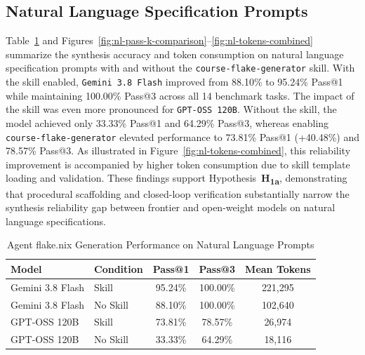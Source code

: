 \subsection{Natural Language Specification Prompts}
\label{subsec:nl-results}

Table~\ref{tab:model-synthesis-results} and Figures~\ref{fig:nl-pass-k-comparison}--\ref{fig:nl-tokens-combined}
summarize the synthesis accuracy and token consumption on natural language
specification prompts with and without the \texttt{course-flake-generator} skill.
With the skill enabled, \texttt{Gemini 3.8 Flash} improved from 88.10\% to 95.24\%
Pass@1 while maintaining 100.00\% Pass@3 across all 14 benchmark tasks. The
impact of the skill was even more pronounced for \texttt{GPT-OSS 120B}. Without
the skill, the model achieved only 33.33\% Pass@1 and 64.29\% Pass@3, whereas
enabling \texttt{course-flake-generator} elevated performance to 73.81\% Pass@1
(+40.48\%) and 78.57\% Pass@3. As illustrated in Figure~\ref{fig:nl-tokens-combined},
this reliability improvement is accompanied by higher token consumption due to skill
template loading and validation. These findings support Hypothesis~\textbf{H\textsubscript{1a}},
demonstrating that procedural scaffolding and closed-loop verification
substantially narrow the synthesis reliability gap between frontier and open-weight
models on natural language specifications.

\begin{table}[htbp]
	\centering
	\caption{Agent flake.nix Generation Performance on Natural Language Prompts}
	\label{tab:model-synthesis-results}
	\begin{tabular}{llccc}
		\toprule \textbf{Model}   & \textbf{Condition} & \textbf{Pass@1} & \textbf{Pass@3} & \textbf{Mean Tokens} \\
		\midrule Gemini 3.8 Flash & Skill              & 95.24\%         & 100.00\%        & 221,295              \\
		Gemini 3.8 Flash          & No Skill           & 88.10\%         & 100.00\%        & 102,640              \\
		\midrule GPT-OSS 120B     & Skill              & 73.81\%         & 78.57\%         & 26,974               \\
		GPT-OSS 120B              & No Skill           & 33.33\%         & 64.29\%         & 18,116               \\
		\bottomrule
	\end{tabular}
\end{table}

